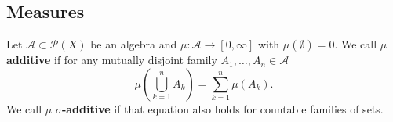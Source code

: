 \subsection{Measures}

\begin{definition}
  Let $\mathcal A \subset \mathcal P(X)$ be an algebra
  and $\mu\colon \mathcal A \to [0, \infty]$ with $\mu(\emptyset) = 0$.
  We call $\mu$ \textbf{additive} if for any mutually disjoint family $A_1, \ldots, A_n \in \mathcal A$
  \[\mu \left(\bigcup_{k=1}^n A_k \right) = \sum_{k=1}^n \mu(A_k).\]
  We call $\mu$ \textbf{$\sigma$-additive} if that equation also holds for countable families of sets.
\end{definition}




